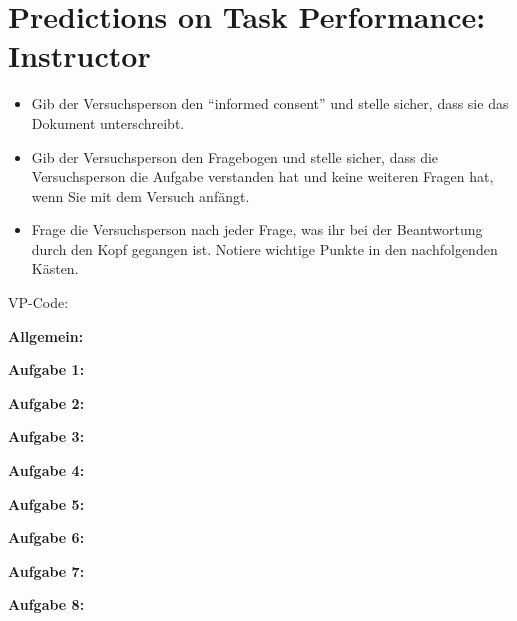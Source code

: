 \documentclass[color=9c]{tudaexercise}
\def\boxheight{1.2cm}
\begin{document}
\section*{Predictions on Task Performance: Instructor}

\begin{itemize}
	\item Gib der Versuchsperson den ``informed consent'' und stelle sicher, dass sie das Dokument unterschreibt.
	\item Gib der Versuchsperson den Fragebogen und stelle sicher, dass die Versuchsperson die Aufgabe verstanden hat und keine weiteren Fragen hat, wenn Sie mit dem Versuch anfängt.
	\item Frage die Versuchsperson nach jeder Frage, was ihr bei der Beantwortung durch den Kopf gegangen ist. Notiere wichtige Punkte in den nachfolgenden Kästen.
\end{itemize}

VP-Code: \fbox{\color{white}\rule{2cm}{2mm}\color{black}}

\vspace{2mm}

\noindent\textbf{Allgemein:}\\
\fbox{\color{white}\rule{.99\linewidth}{\boxheight}\color{black}}

\noindent\textbf{Aufgabe 1:}\\
\fbox{\color{white}\rule{.99\linewidth}{\boxheight}\color{black}}

\noindent\textbf{Aufgabe 2:}\\
\fbox{\color{white}\rule{.99\linewidth}{\boxheight}\color{black}}

\noindent\textbf{Aufgabe 3:}\\
\fbox{\color{white}\rule{.99\linewidth}{\boxheight}\color{black}}

\noindent\textbf{Aufgabe 4:}\\
\fbox{\color{white}\rule{.99\linewidth}{\boxheight}\color{black}}

\noindent\textbf{Aufgabe 5:}\\
\fbox{\color{white}\rule{.99\linewidth}{\boxheight}\color{black}}

\noindent\textbf{Aufgabe 6:}\\
\fbox{\color{white}\rule{.99\linewidth}{\boxheight}\color{black}}

\noindent\textbf{Aufgabe 7:}\\
\fbox{\color{white}\rule{.99\linewidth}{\boxheight}\color{black}}

\noindent\textbf{Aufgabe 8:}\\
\fbox{\color{white}\rule{.99\linewidth}{\boxheight}\color{black}}
\end{document}
